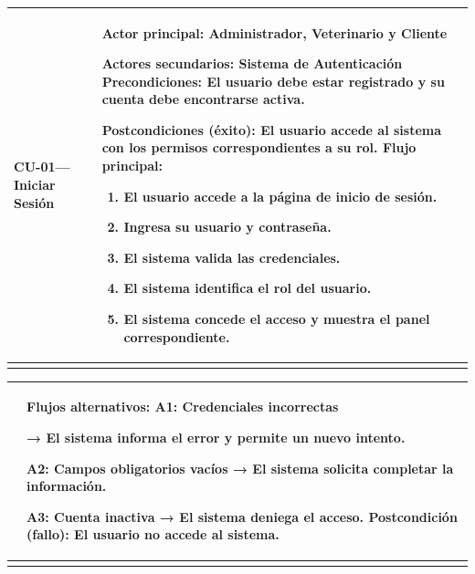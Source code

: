 \documentclass[
]{article}
\newcounter{none} %
\begin{document}
{\def\LTcaptype{none} %
\begin{longtable}[]{@{}
  >{\raggedright\arraybackslash}p{}
  >{\raggedright\arraybackslash}p{}@{}}
\toprule\noalign{}
\begin{minipage}[b]{\linewidth}\raggedright
CU-01--- Iniciar Sesión
\end{minipage} & \begin{minipage}[b]{\linewidth}\raggedright
\textbf{Actor principal:} Administrador, Veterinario y Cliente

\textbf{Actores secundarios:} Sistema de Autenticación
\textbf{Precondiciones:} El usuario debe estar registrado y su cuenta
debe encontrarse activa.

\textbf{Postcondiciones (éxito):} El usuario accede al sistema con los
permisos correspondientes a su rol. \textbf{Flujo principal:}

\begin{enumerate}
\def\labelenumi{\arabic{enumi}.}
\item
  El usuario accede a la página de inicio de sesión.
\item
  Ingresa su usuario y contraseña.
\item
  El sistema valida las credenciales.
\item
  El sistema identifica el rol del usuario.
\item
  El sistema concede el acceso y muestra el panel correspondiente.
\end{enumerate}
\end{minipage} \\
\midrule\noalign{}
\endhead
\bottomrule\noalign{}
\endlastfoot
\end{longtable}
}

{\def\LTcaptype{none} %
\begin{longtable}[]{@{}
  >{\raggedright\arraybackslash}p{}
  >{\raggedright\arraybackslash}p{}@{}}
\toprule\noalign{}
\begin{minipage}[b]{\linewidth}\raggedright
\end{minipage} & \begin{minipage}[b]{\linewidth}\raggedright
\textbf{Flujos alternativos:} A1: Credenciales incorrectas

→ El sistema informa el error y permite un nuevo intento.

A2: Campos obligatorios vacíos → El sistema solicita completar la
información.

A3: Cuenta inactiva → El sistema deniega el acceso.
\textbf{Postcondición (fallo):} El usuario no accede al sistema.
\end{minipage} \\
\midrule\noalign{}
\endhead
\bottomrule\noalign{}
\endlastfoot
\end{longtable}
}
\end{document}
